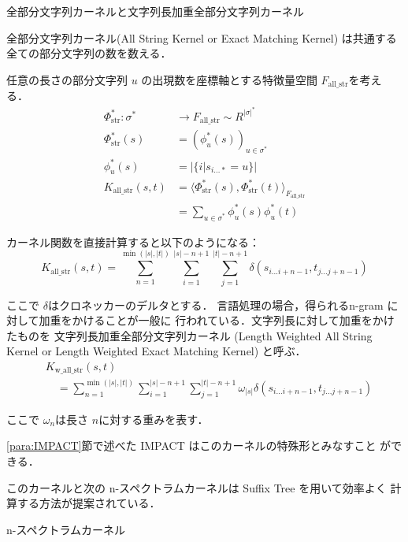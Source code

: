 \documentclass[japanese]{jnlp_1.4}
\renewcommand{\paragraph}{}
\begin{document}
\paragraph{全部分文字列カーネルと文字列長加重全部分文字列カーネル}
\label{para:allstr}

全部分文字列カーネル(All String Kernel or Exact Matching Kernel)
は共通する全ての部分文字列の数を数える．

任意の長さの部分文字列 $u$ の出現数を座標軸とする特徴量空間 $F_{\mbox{all\_str}}$を考える．
\begin{align*}
\Phi^{*}_{\mbox{str}}: \sigma^{*} & \rightarrow  F_{\mbox{all\_str}} \sim R^{|\sigma|^{*}} \\
\Phi^{*}_{\mbox{str}}(s) & =  (\phi^{*}_{u}(s))_{u \in \sigma^{*}} \\
\phi^{*}_{u}(s) & =  |\{i|s_{i \ldots *} = u\}|  \\
K_{\mbox{all\_str}}(s,t) & =  \langle \Phi^{*}_{\mbox{str}} (s), \Phi^{*}_{\mbox{str}} (t) \rangle_{F_{\mbox{all\_str}}} \\
 & = \sum_{u \in \sigma^{*}} \phi^{*}_{u} (s) \phi^{*}_{u} (t) 
\end{align*}

カーネル関数を直接計算すると以下のようになる：
\[
K_{\mbox{all\_str}}(s,t) = \sum^{\min(|s|,|t|)}_{n=1}
\sum^{|s|-n+1}_{i=1} \sum^{|t|-n+1}_{j=1}
\delta (s_{i \ldots i + n - 1},t_{j \ldots j + n - 1}) 
\]

ここで $\delta$はクロネッカーのデルタとする．
言語処理の場合，得られるn-gram に対して加重をかけることが一般に
行われている．文字列長に対して加重をかけたものを
文字列長加重全部分文字列カーネル
(Length Weighted All String Kernel or Length Weighted Exact Matching
Kernel)
と呼ぶ．
\[
\begin{split}
 & K_{\mbox{w\_all\_str}}(s,t) \\
 & \quad = \sum^{\min(|s|,|t|)}_{n=1}
\sum^{|s|-n+1}_{i=1} \sum^{|t|-n+1}_{j=1}
\omega_{|s|} \delta (s_{i \ldots i + n - 1},t_{j \ldots j + n - 1})
\end{split}
\]

ここで $\omega_{n}$は長さ $n$に対する重みを表す．

\ref{para:IMPACT}節で述べた IMPACT はこのカーネルの特殊形とみなすこと
ができる．

このカーネルと次の n-スペクトラムカーネルは Suffix Tree を用いて効率よく
計算する方法が提案されている．


\paragraph{n-スペクトラムカーネル}
\label{para:n-spec-k}
\end{document}
